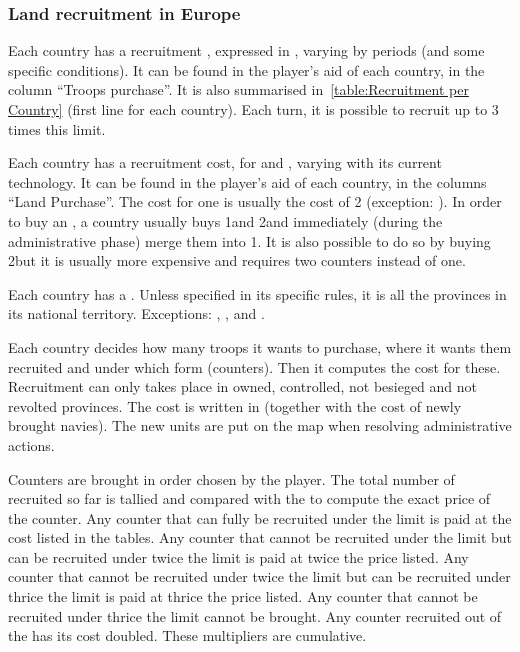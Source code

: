 \subsubsection{Land recruitment in Europe}
\aparag[Limit]
\bparag Each country has a recruitment , expressed in \LD,
varying by periods (and some specific conditions).
\bparag It can be found in the player's aid of each country, in the column
``Troops purchase''.
\bparag It is also summarised in~\ref{table:Recruitment per Country} (first
line for each country).
\bparag Each turn, it is possible to recruit up to 3 times this limit.

\aparag[Costs]
\bparag Each country has a recruitment cost, for \LD and \ARMY\Facemoins,
varying with its current technology.
\bparag It can be found in the player's aid of each country, in the columns
``Land Purchase''.
\bparag The cost for one \ARMY\Facemoins is usually the cost of 2\LD
(exception: \RUS).
\bparag In order to buy an \ARMY\Faceplus, a country usually buys
1\ARMY\Facemoins and 2\LD and immediately (during the administrative phase)
merge them into 1\ARMY\Faceplus. It is also possible to do so by buying
2\ARMY\Facemoins but it is usually more expensive and requires two \ARMY
counters instead of one.

 Each country has a . Unless
specified in its specific rules, it is all the provinces in its national
territory.
\bparag Exceptions: \HIS, \TUR, \RUS and \SUE.

\aparag[Recruitment.] Each country decides how many troops it wants to
purchase, where it wants them recruited and under which form (counters). Then
it computes the cost for these.
\bparag Recruitment can only takes place in owned, controlled, not besieged
and not revolted provinces.
\bparag The cost is written in  (together with the
cost of newly brought navies).
\bparag The new units are put on the map when resolving administrative
actions.

\aparag[Multipliers.] Counters are brought in order chosen by the player. The
total number of \LD recruited so far is tallied and compared with the
 to compute the exact price of the counter.
\bparag Any counter that can fully be recruited under the limit is paid at the
cost listed in the tables.
\bparag Any counter that cannot be recruited under the limit but can be
recruited under twice the limit is paid at twice the price listed.
\bparag Any counter that cannot be recruited under twice the limit but can be
recruited under thrice the limit is paid at thrice the price listed.
\bparag Any counter that cannot be recruited under thrice the limit cannot be
brought.
\bparag Any counter recruited out of the  has its cost
doubled.
\bparag These multipliers are cumulative.

